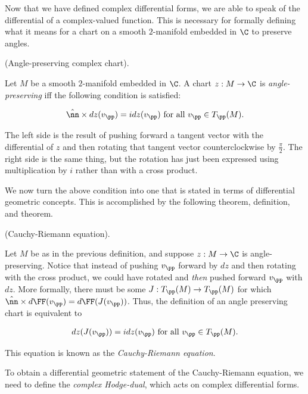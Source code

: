 Now that we have defined complex differential forms, we are able to speak of the differential of a complex-valued function. This is necessary for formally defining what it means for a chart on a smooth $2$-manifold embedded in $\C$ to preserve angles.

\begin{defn}
    (Angle-preserving complex chart).
    
    Let $M$ be a smooth $2$-manifold embedded in $\C$. A chart $z:M \rightarrow \C$ is \textit{angle-preserving} iff the following condition is satisfied:
    
    \begin{align*}
        \hat{\nn} \times dz(v_\pp) = i dz(v_\pp) \text{ for all $v_\pp \in T_\pp(M)$}.
    \end{align*}
    
    The left side is the result of pushing forward a tangent vector with the differential of $z$ and then rotating that tangent vector counterclockwise by $\frac{\pi}{2}$. The right side is the same thing, but the rotation has just been expressed using multiplication by $i$ rather than with a cross product.
\end{defn}

We now turn the above condition into one that is stated in terms of differential geometric concepts. This is accomplished by the following theorem, definition, and theorem.

\begin{theorem}
    (Cauchy-Riemann equation).

    Let $M$ be as in the previous definition, and suppose $z:M \rightarrow \C$ is angle-preserving. Notice that instead of pushing $v_\pp$ forward by $dz$ and then rotating with the cross product, we could have rotated and \textit{then} pushed forward $v_\pp$ with $dz$. More formally, there must be some $J:T_\pp(M) \rightarrow T_\pp(M)$ for which $\hat{\nn} \times d\FF(v_\pp) = d\FF(J(v_\pp))$. Thus, the definition of an angle preserving chart is equivalent to

    \begin{align*}
        dz(J(v_\pp)) = idz(v_\pp) \text{ for all $v_\pp \in T_\pp(M)$}.
    \end{align*}
    
    This equation is known as the \textit{Cauchy-Riemann equation}.
\end{theorem}

To obtain a differential geometric statement of the Cauchy-Riemann equation, we need to define the \textit{complex Hodge-dual}, which acts on complex differential forms.

